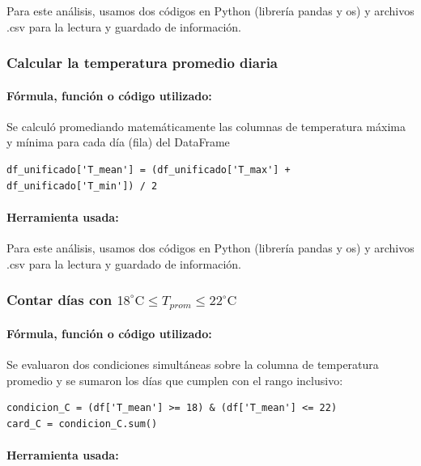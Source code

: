 \documentclass[12pt]{article}
\begin{document}
Para este análisis, usamos dos códigos en Python (librería pandas y os) y archivos .csv para la lectura y guardado de información.

\subsubsection{Calcular la temperatura promedio diaria}

\paragraph{Fórmula, función o código utilizado:}

Se calculó promediando matemáticamente las columnas de temperatura máxima y mínima para cada día (fila) del DataFrame

\begin{verbatim}
df_unificado['T_mean'] = (df_unificado['T_max'] + df_unificado['T_min']) / 2
\end{verbatim}

\paragraph{Herramienta usada:}

Para este análisis, usamos dos códigos en Python (librería pandas y os) y archivos .csv para la lectura y guardado de información.

\subsubsection{Contar días con $18^\circ \text{C} \leq T_{prom} \leq 22^\circ \text{C}$}

\paragraph{Fórmula, función o código utilizado:}

Se evaluaron dos condiciones simultáneas sobre la columna de temperatura promedio y se sumaron los días que cumplen con el rango inclusivo:
\begin{verbatim}
condicion_C = (df['T_mean'] >= 18) & (df['T_mean'] <= 22)
card_C = condicion_C.sum()
\end{verbatim}

\paragraph{Herramienta usada:}
\end{document}
